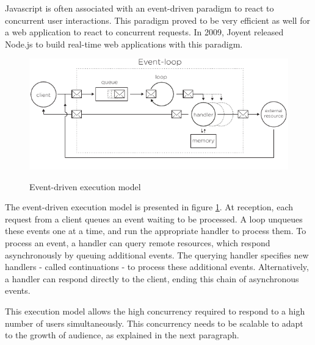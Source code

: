 Javascript is often associated with an event-driven paradigm to react to concurrent user interactions.
This paradigm proved to be very efficient as well for a web application to react to concurrent requests.
In 2009, Joyent released Node.js to build real-time web applications with this paradigm.

\begin{figure}[h!]
  \centering
  \includegraphics[width=0.7\linewidth]{../resources/event-loop.pdf}
  \label{fig:event-loop}
  \caption{Event-driven execution model}
\end{figure}

The event-driven execution model is presented in figure \ref{fig:event-loop}.
At reception, each request from a client queues an event waiting to be processed.
A loop unqueues these events one at a time, and run the appropriate handler to process them.
To process an event, a handler can query remote resources, which respond asynchronously by queuing additional events.
The querying handler specifies new handlers - called continuations - to process these additional events.
Alternatively, a handler can respond directly to the client, ending this chain of asynchronous events.


This execution model allows the high concurrency required to respond to a high number of users simultaneously.
This concurrency needs to be scalable to adapt to the growth of audience, as explained in the next paragraph.

